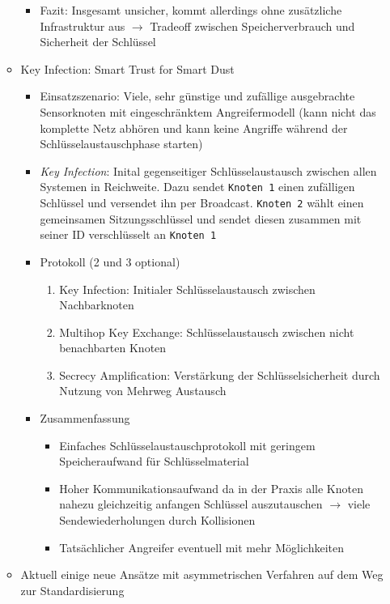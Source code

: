\begin{itemize}
\begin{itemize}
\begin{itemize}
			\item Fazit: Insgesamt unsicher, kommt allerdings ohne zusätzliche Infrastruktur aus \(\rightarrow\) Tradeoff zwischen Speicherverbrauch und Sicherheit der Schlüssel
		\end{itemize}
		\item Key Infection: Smart Trust for Smart Dust
		\begin{itemize}
			\item Einsatzszenario: Viele, sehr günstige und zufällige ausgebrachte Sensorknoten mit eingeschränktem Angreifermodell (kann nicht das komplette Netz abhören und kann keine Angriffe während der Schlüsselaustauschphase starten)
			\item \textit{Key Infection}: Inital gegenseitiger Schlüsselaustausch zwischen allen Systemen in Reichweite. Dazu sendet \texttt{Knoten 1} einen zufälligen Schlüssel und versendet ihn per Broadcast. \texttt{Knoten 2} wählt einen gemeinsamen Sitzungsschlüssel und sendet diesen zusammen mit seiner ID verschlüsselt an \texttt{Knoten 1}
			\item Protokoll (2 und 3 optional)
			\begin{enumerate}
				\item Key Infection: Initialer Schlüsselaustausch zwischen Nachbarknoten
				\item Multihop Key Exchange: Schlüsselaustausch zwischen nicht benachbarten Knoten
				\item Secrecy Amplification: Verstärkung der Schlüsselsicherheit durch Nutzung von Mehrweg Austausch
			\end{enumerate}
			\item Zusammenfassung
			\begin{itemize}
				\item Einfaches Schlüsselaustauschprotokoll mit geringem Speicheraufwand für Schlüsselmaterial
				\item Hoher Kommunikationsaufwand da in der Praxis alle Knoten nahezu gleichzeitig anfangen Schlüssel auszutauschen \(\rightarrow\) viele Sendewiederholungen durch Kollisionen
				\item Tatsächlicher Angreifer eventuell mit mehr Möglichkeiten
			\end{itemize}
		\end{itemize}
		\item Aktuell einige neue Ansätze mit asymmetrischen Verfahren auf dem Weg zur Standardisierung
	\end{itemize}
\end{itemize}


